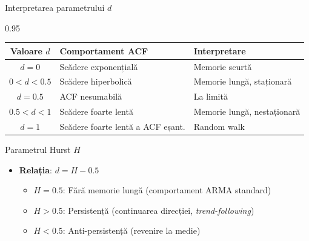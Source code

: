 \documentclass[9pt, aspectratio=169, t]{beamer}
\begin{document}
\begin{frame}{Interpretarea parametrului $d$}
    \begin{cminipage}{0.95\textwidth}
        \begin{center}
            \begin{tabular}{c|l|l}
                \toprule
                \textbf{Valoare $d$} & \textbf{Comportament ACF} & \textbf{Interpretare} \\
                \midrule
                $d = 0$ & Scădere exponențială & Memorie scurtă \\
                $0 < d < 0.5$ & Scădere hiperbolică & Memorie lungă, staționară \\
                $d = 0.5$ & ACF nesumabilă & La limită \\
                $0.5 < d < 1$ & Scădere foarte lentă & Memorie lungă, nestaționară \\
                $d = 1$ & Scădere foarte lentă a ACF eșant. & Random walk \\
                \bottomrule
            \end{tabular}
        \end{center}

        \vspace{0.1cm}

        \begin{block}{Parametrul Hurst $H$}
            \begin{itemize}\setlength{\itemsep}{0pt}
                \item \textbf{Relația}: $d = H - 0.5$
                \begin{itemize}\setlength{\itemsep}{0pt}
                    \item $H = 0.5$: Fără memorie lungă (comportament ARMA standard)
                    \item $H > 0.5$: Persistență (continuarea direcției, \emph{trend-following})
                    \item $H < 0.5$: Anti-persistență (revenire la medie)
                \end{itemize}
            \end{itemize}
        \end{block}
    \end{cminipage}
\end{frame}
\end{document}
